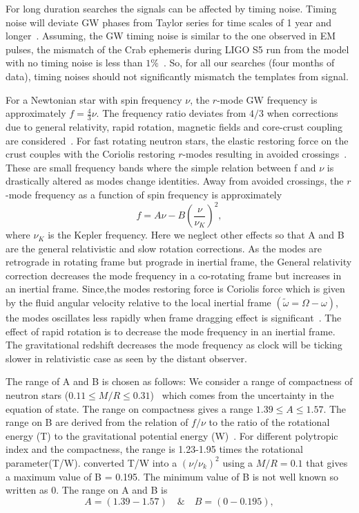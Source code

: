 \documentclass{ttuthes2007}
\begin{document}
For long duration searches the signals can be affected by timing noise. Timing
noise will deviate \ac{GW} phases from Taylor series for time scales of 1 year
and longer~\cite{Jones_2004}. Assuming, the \ac{GW} timing noise is similar to
the one observed in EM pulses, the mismatch of the Crab ephemeris during LIGO S5
run from the model with no timing noise is less than
$1\%$~\cite{PhysRevD.91.062009}.  So, for all our searches (four months of
data), timing noises should not significantly mismatch the templates from
signal.

For a Newtonian star with spin frequency $\nu$, the $r$-mode \ac{GW} frequency is approximately $f=\frac{4}{3}\nu$. The frequency ratio
deviates from $4/3$ when corrections due to general relativity, rapid rotation,
magnetic fields and core-crust coupling are considered~\cite{Idrisy:2014qca}.
For fast rotating neutron stars, the elastic restoring force on the crust
couples with the Coriolis restoring $r$-modes resulting in avoided
crossings~\cite{Levin_2001}. These are small frequency bands where the simple
relation between f and $\nu$ is drastically altered as modes change identities.
Away from avoided crossings, the $r$-mode frequency as a function of spin
frequency is approximately
\begin{equation}
f=A\nu-B\left(\frac{\nu}{\nu_K}\right)^2, 
\end{equation} 
where $\nu_K$ is the Kepler frequency. Here we neglect other effects so that A
and B are the general relativistic and slow rotation corrections.  
As the modes are retrograde in rotating frame but prograde in inertial frame,
the General relativity correction decreases the mode frequency in a co-rotating
frame but increases in an inertial frame.  Since,the modes restoring force is
Coriolis force which is given by the fluid angular velocity relative to the
local inertial frame $(\tilde\omega=\Omega - \omega)$, the modes oscillates less
rapidly when frame dragging effect is
significant~\cite{Lockitch:2000aa,1968ApJ...153..807H}. The effect of rapid
rotation is to decrease the mode frequency in an inertial frame.  The
gravitational redshift decreases the mode frequency as clock will be ticking
slower in relativistic case as seen by the distant observer. 

The range of A and B is chosen as follows: We consider a range of compactness of
neutron stars ($0.11\leq M/R\leq 0.31$)~\cite{Idrisy:2014qca} which comes from
the uncertainty in the equation of state. The range on compactness gives a range
$1.39\leq A \leq 1.57$. The range on B are derived from the relation of $f/\nu$
to the ratio of the rotational energy (T) to the gravitational potential energy
(W)~\cite{Yoshida:2004gk}. For different polytropic index and the compactness,
the range is 1.23-1.95 times the rotational parameter(T/W). \citet{Caride2019}
converted T/W into a $(\nu/\nu_k)^2$ using a $M/R=0.1$ that gives a maximum
value of B = 0.195. The minimum value of B is not well known so written as 0. 
The range on A and B is
\begin{equation}
 A=(1.39-1.57) \quad \& \quad B=(0-0.195), 
\end{equation}
\end{document}
